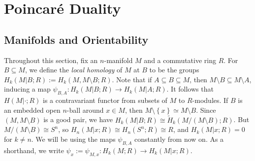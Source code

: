 \documentclass{book}
\newcommand{\set}[1]{\left\{ {#1} \right\}}
\theoremstyle{definition}
\theoremstyle{remark}
\numberwithin{equation}{section}
\begin{document}
\chapter{Poincar\'e Duality}
\section{Manifolds and Orientability}

Throughout this section, fix an $n$-manifold $M$ and a commutative ring $R$. For $B \subseteq M$, we define the \textit{local homology} of $M$ at $B$ to be the groups $H_k(M \vert B;R) := H_k(M,M \setminus B;R)$. Note that if $A \subseteq B \subseteq M$, then $M \setminus B \subseteq M \setminus A$, inducing a map $\psi_{B,A} \colon H_k(M \vert B;R) \to H_k(M \vert A;R)$. It follows that $H(M \vert \cdot;R)$ is a contravariant functor from subsets of $M$ to $R$-modules. If $B$ is an embedded open $n$-ball around $x \in M$, then $M \setminus \set{x} \simeq M \setminus B$. Since $(M,M \setminus B)$ is a good pair, we have $H_k(M \vert B;R) \cong \widetilde{H}_k(M / (M \setminus B) ; R)$. But $M / (M \setminus B) \cong S^n$, so $H_n(M \vert x ; R) \cong H_n(S^n ; R) \cong R$, and $H_k(M \vert x ; R) = 0$ for $k \neq n$.
We will be using the maps $\psi_{B,A}$ constantly from now on. As a shorthand, we write $\psi_x := \psi_{M,x} \colon H_k(M;R) \to H_k(M \vert x;R)$.
\end{document}
